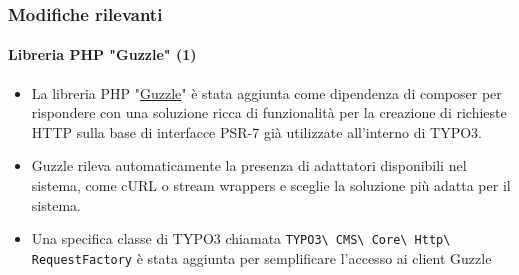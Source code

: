 \begin{frame}[fragile]
	\frametitle{Modifiche rilevanti}
	\framesubtitle{Libreria PHP "Guzzle" (1)}

	\begin{itemize}

		\item La libreria PHP
			"\href{http://docs.guzzlephp.org}{Guzzle}"
			è stata aggiunta come dipendenza di composer per rispondere con una soluzione
			ricca di funzionalità per la creazione di richieste HTTP sulla base di interfacce
			PSR-7 già utilizzate all'interno di TYPO3.

		\item Guzzle rileva automaticamente la presenza di adattatori disponibili nel sistema,
			come cURL o stream wrappers e sceglie la soluzione più adatta per il sistema.

		\item Una specifica classe di TYPO3 chiamata
			\texttt{TYPO3\textbackslash
				CMS\textbackslash
				Core\textbackslash
				Http\textbackslash
				RequestFactory}\newline
			è stata aggiunta per semplificare l'accesso ai client Guzzle

	\end{itemize}

\end{frame}


